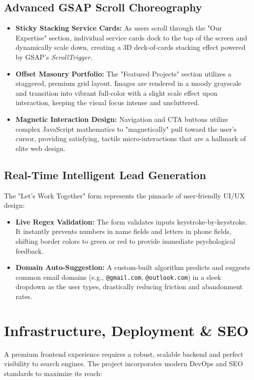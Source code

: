 \documentclass[11pt, a4paper]{article}
\begin{document}
\subsection{Advanced GSAP Scroll Choreography}
\begin{itemize}[label=\textcolor{orluxgold}{\textbullet}]
    \item \textbf{Sticky Stacking Service Cards:} As users scroll through the "Our Expertise" section, individual service cards dock to the top of the screen and dynamically scale down, creating a 3D deck-of-cards stacking effect powered by GSAP's \textit{ScrollTrigger}.
    \item \textbf{Offset Masonry Portfolio:} The "Featured Projects" section utilizes a staggered, premium grid layout. Images are rendered in a moody grayscale and transition into vibrant full-color with a slight scale effect upon interaction, keeping the visual focus intense and uncluttered.
    \item \textbf{Magnetic Interaction Design:} Navigation and CTA buttons utilize complex JavaScript mathematics to "magnetically" pull toward the user's cursor, providing satisfying, tactile micro-interactions that are a hallmark of elite web design.
\end{itemize}

\subsection{Real-Time Intelligent Lead Generation}
The "Let's Work Together" form represents the pinnacle of user-friendly UI/UX design:
\begin{itemize}[label=\textcolor{orluxgold}{\textbullet}]
    \item \textbf{Live Regex Validation:} The form validates inputs keystroke-by-keystroke. It instantly prevents numbers in name fields and letters in phone fields, shifting border colors to green or red to provide immediate psychological feedback.
    \item \textbf{Domain Auto-Suggestion:} A custom-built algorithm predicts and suggests common email domains (e.g., \texttt{@gmail.com}, \texttt{@outlook.com}) in a sleek dropdown as the user types, drastically reducing friction and abandonment rates.
\end{itemize}

\section{Infrastructure, Deployment \& SEO}
A premium frontend experience requires a robust, scalable backend and perfect visibility to search engines. The project incorporates modern DevOps and SEO standards to maximize its reach:
\end{document}
